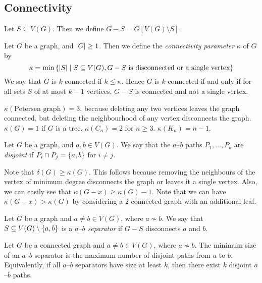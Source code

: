 \subsection{Connectivity}
Let \( S \subseteq V(G) \).
Then we define \( G - S = G[V(G) \setminus S] \).
\begin{definition}
	Let \( G \) be a graph, and \( \abs{G} \geq 1 \).
	Then we define the \emph{connectivity parameter} \( \kappa \) of \( G \) by
	\[ \kappa = \min\qty{\abs{S} \mid S \subseteq V(G), G - S \text{ is disconnected or a single vertex}} \]
	We say that \( G \) is \( k \)-connected if \( k \leq \kappa \).
	Hence \( G \) is \( k \)-connected if and only if for all sets \( S \) of at most \( k-1 \) vertices, \( G - S \) is connected and not a single vertex.
\end{definition}
\begin{example}
	\( \kappa(\text{Petersen graph}) = 3 \), because deleting any two vertices leaves the graph connected, but deleting the neighbourhood of any vertex disconnects the graph.
	\( \kappa(G) = 1 \) if \( G \) is a tree.
	\( \kappa(C_n) = 2 \) for \( n \geq 3 \).
	\( \kappa(K_n) = n - 1 \).
\end{example}
\begin{definition}
	Let \( G \) be a graph, and \( a, b \in V(G) \).
	We say that the \( a \)--\( b \) paths \( P_1, \dots, P_k \) are \emph{disjoint} if \( P_i \cap P_j = \qty{a, b} \) for \( i \neq j \).
\end{definition}
Note that \( \delta(G) \geq \kappa(G) \).
This follows because removing the neighbours of the vertex of minimum degree disconnects the graph or leaves it a single vertex.
Also, we can easily see that \( \kappa(G - x) \geq \kappa(G) - 1 \).
Note that we can have \( \kappa(G-x) > \kappa(G) \) by considering a \( 2 \)-connected graph with an additional leaf.
\begin{definition}
	Let \( G \) be a graph and \( a \neq b \in V(G) \), where \( a \not\sim b \).
	We say that \( S \subseteq V(G) \setminus \qty{a,b} \) is a \emph{\( a \)--\( b \) separator} if \( G - S \) disconnects \( a \) and \( b \).
\end{definition}
\begin{theorem}
	Let \( G \) be a connected graph and \( a \neq b \in V(G) \), where \( a \not\sim b \).
	The minimum size of an \( a \)--\( b \) separator is the maximum number of disjoint paths from \( a \) to \( b \).
	Equivalently, if all \( a \)--\( b \) separators have size at least \( k \), then there exist \( k \) disjoint \( a \)--\( b \) paths.
\end{theorem}
